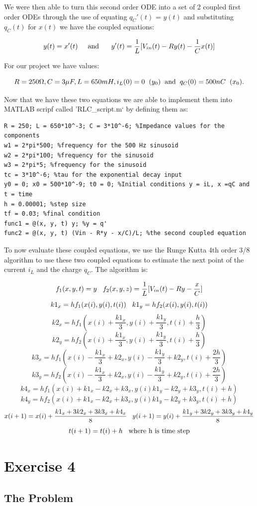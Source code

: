 \documentclass[11pt,a4paper]{article}
\begin{document}
We were then able to turn this second order ODE into a set of 2 coupled first order ODEs through the use of equating $q_C'(t)$ = $y(t)$ and substituting $q_C(t)$ for $x(t)$ we have the coupled equations:

\[y(t) = x'(t) \text{\hspace{5mm}and \hspace{5mm}}y'(t) = \frac{1}{L}[V_{in}(t)  - Ry(t) - \frac{1}{C}x(t)] \]

For our project we have values:

\[R = 250 \Omega, C = 3 \mu F , L = 650 mH, i_L(0) = 0 \hspace{2mm} (y_0) \text{\hspace{2mm}and\hspace{2mm}} q_C(0) = 500nC \hspace{2mm} (x_0).\]

Now that we have these two equations we are able to implement them into MATLAB scripf called 'RLC\_script.m` by defining them as:

\begin{verbatim}
R = 250; L = 650*10^-3; C = 3*10^-6; %Impedance values for the components
w1 = 2*pi*500; %frequency for the 500 Hz sinusoid
w2 = 2*pi*100; %frequency for the sinusoid
w3 = 2*pi*5; %frequency for the sinusoid
tc = 3*10^-6; %tau for the exponential decay input
y0 = 0; x0 = 500*10^-9; t0 = 0; %Initial conditions y = iL, x =qC and t = time
h = 0.00001; %step size
tf = 0.03; %final condition
func1 = @(x, y, t) y; %y = q'
func2 = @(x, y, t) (Vin - R*y - x/C)/L; %the second coupled equation
\end{verbatim}

To now evaluate these coupled equations, we use the Runge Kutta 4th order 3/8 algorithm to use these two coupled equations to estimate the next point of the current $i_L$ and the charge $q_C$. The algorithm is:

\[f_1(x,y,t) = y \hspace{3mm} f_2(x,y,z) = \frac{1}{L}[V_{in}(t) - Ry - \frac{x}{C}]\]
\[k1_x = hf_1(x(i),y(i),t(i)) \hspace{3mm} k1_y = hf_2(x(i),y(i),t(i))\]
\[k2_x = hf_1(x(i)+\frac{k1_x}{3},y(i)+\frac{k1_y}{3},t(i)+\frac{h}{3}) \] 
\[k2_y = hf_2(x(i)+\frac{k1_x}{3},y(i)+\frac{k1_y}{3},t(i)+\frac{h}{3})\]
\[k3_x = hf_1(x(i)-\frac{k1_x}{3}+k2_x,y(i)-\frac{k1_y}{3}+k2_y,t(i)+\frac{2h}{3}) \]
\[k3_y = hf_2(x(i)-\frac{k1_x}{3}+k2_x,y(i)-\frac{k1_y}{3}+k2_y,t(i)+\frac{2h}{3})\]
\[k4_x = hf_1(x(i)+k1_x-k2_x+k3_x,y(i)k1_y-k2_y+k3_y,t(i)+h) \]
\[k4_y = hf_2(x(i)+k1_x-k2_x+k3_x,y(i)k1_y-k2_y+k3_y,t(i)+h)\]
\[x(i+1) =x(i)+\frac{k1_x+3k2_x+3k3_x+k4_x}{8} \hspace{3mm} y(i+1) =y(i)+\frac{k1_y+3k2_y+3k3_y+k4_y}{8}\]
\[t(i+1) = t(i) + h \hspace{3mm} \text{where h is time step}\]
\section*{Exercise 4}\vspace{-1mm}
\subsection*{The Problem}
\end{document}
